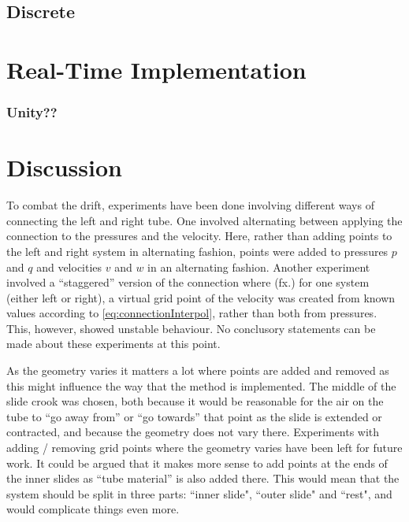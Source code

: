 \subsection{Discrete}

\section{Real-Time Implementation}
\subsubsection{Unity??}

\section{Discussion}
To combat the drift, experiments have been done involving different ways of connecting the left and right tube. One involved alternating between applying the connection to the pressures and the velocity. Here, rather than adding points to the left and right system in alternating fashion, points were added to pressures $p$ and $q$ and velocities $v$ and $w$ in an alternating fashion. Another experiment involved a ``staggered'' version of the connection where (fx.) for one system (either left or right), a virtual grid point of the velocity was created from known values according to \eqref{eq:connectionInterpol}, rather than both from pressures. This, however, showed unstable behaviour. No conclusory statements can be made about these experiments at this point. 



As the geometry varies it matters a lot where points are added and removed as this might influence the way that the method is implemented.  The middle of the slide crook was chosen, both because it would be reasonable for the air on the tube to ``go away from'' or ``go towards'' that point as the slide is extended or contracted, and because the geometry does not vary there. Experiments with adding / removing grid points where the geometry varies have been left for future work.  It could be argued that it makes more sense to add points at the ends of the inner slides as ``tube material'' is also added there. This would mean that the system should be split in three parts: ``inner slide", ``outer slide" and ``rest", and would complicate things even more.
